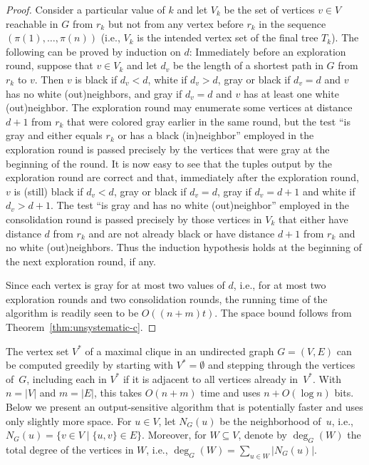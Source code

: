 \documentclass[envcountsame,envcountsect,undated,nolinenumbers]{lnthi}
\begin{document}
\begin{proof}
Consider a particular value of $k$ and
let $V_k$ be the set of vertices $v\in V$
reachable in $G$ from $r_k$
but not from any vertex before $r_k$ in the sequence
$(\pi(1),\ldots,\pi(n))$
(i.e.,
$V_k$ is the intended vertex set of the final tree $T_k$).
The following can be proved by induction on $d$:
Immediately before an exploration round,
suppose that $v\in V_k$
and let $d_v$ be the length of a shortest path
in $G$ from $r_k$ to $v$.
Then $v$ is black if $d_v<d$,
white if $d_v>d$,
gray or black if $d_v=d$ and $v$ has no
white (out)neighbors, and
gray if $d_v=d$ and $v$ has at least one
white (out)neighbor.
The exploration round may enumerate some vertices
at distance $d+1$ from $r_k$ that were colored
gray earlier in the same round, but
the test ``is gray and either equals $r_k$ or
has a black (in)neighbor''
employed in the exploration round
is passed precisely by the vertices that were
gray at the beginning of the
round.
It is now easy to see that the tuples output
by the exploration round are correct and that,
immediately after the exploration round,
$v$ is (still) black if $d_v<d$, gray
or black if $d_v=d$, gray
if $d_v=d+1$ and white if $d_v>d+1$.
The test ``is gray and has no white (out)neighbor'' employed
in the consolidation round is
passed precisely by those vertices in $V_k$
that either have distance $d$ from $r_k$ and
are not already black or have distance $d+1$ from $r_k$
and no white (out)neighbors.
Thus the induction hypothesis holds at the
beginning of the next exploration round, if any.

Since each vertex is gray for at most two
values of $d$, i.e., for at most two
exploration rounds and two consolidation rounds,
the running time of the algorithm is readily seen
to be $O((n+m)t)$.
The space bound follows from
Theorem~\ref{thm:unsystematic-c}.
\end{proof}

The vertex set $V^*$ of
a maximal clique in an undirected graph $G=(V,E)$ can be computed
greedily by starting with $V^*=\emptyset$ and
stepping through the vertices of~$G$, including 
each in $V^*$ if it is adjacent to all vertices already in~$V^*$.
With $n=|V|$ and $m=|E|$, this takes $O(n+m)$ time
and uses $n+O(\log n)$ bits.
Below we present an output-sensitive algorithm that is potentially
faster and uses only slightly more space.
For $u\in V$, let $N_G(u)$ be the neighborhood of~$u$,
i.e., $N_G(u)=\{v\in V\mid\{u,v\}\in E\}$.
Moreover, for $W\subseteq V$, denote by $\deg_G(W)$ the
total degree of the vertices in $W$,
i.e., $\deg_G(W)=\sum_{u\in W}|N_G(u)|$.
\end{document}
